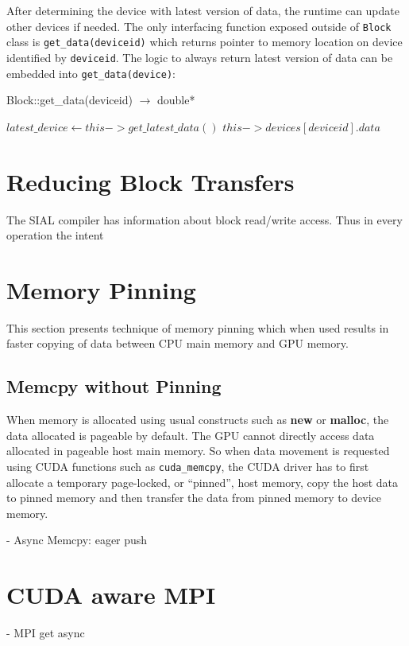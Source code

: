 After determining the device with latest version of data, the runtime can update
other devices if needed. The only interfacing function exposed outside of
\texttt{Block} class is \texttt{get\_data(deviceid)} which returns pointer to memory
location on device identified by \texttt{deviceid}. The logic to always return
latest version of data can be embedded into \texttt{get\_data(device)}:

\begin{algorithm}  {Block::get\_data(deviceid) $\rightarrow$ double*}
  \singlespacing

  \begin{algorithmic}[1]
    \State $latest\_device \gets this->get\_latest\_data()$
    \EndIf
    \State \Return $this->devices[deviceid].data$
    \EndFunction
  \end{algorithmic}
\end{algorithm}

\section{Reducing Block Transfers}
The SIAL compiler has information about block read/write access. Thus in every
operation the intent


\section{Memory Pinning}
This section presents technique of memory pinning which when used results in
faster copying of data between CPU main memory and GPU memory.

\subsection{Memcpy without Pinning}
When memory is allocated using usual constructs such as \textbf{new} or
\textbf{malloc}, the data allocated is pageable by default. The GPU cannot
directly access data allocated in pageable host main memory. So when data
movement is requested using CUDA functions such as \texttt{cuda\_memcpy}, the
CUDA driver has to first allocate a temporary page-locked, or ``pinned'', host
memory, copy the host data to pinned memory and then transfer the data from
pinned memory to device memory.

- Async Memcpy: eager push

\section{CUDA aware MPI}
- MPI get async